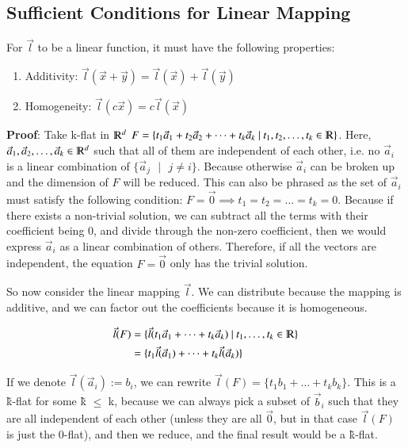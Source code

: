\documentclass [12 pt, twoside] {book}
\newcommand\+{\text{ }}
\begin{document}
\subsection{Sufficient Conditions for Linear Mapping}
For $\vec{l}$ to be a linear function, it must have the following properties:

\begin{enumerate}
    \item Additivity: $\vec{l}(\vec{x} + \vec{y}) = \vec{l}(\vec{x}) +
        \vec{l}(\vec{y})$
    \item Homogeneity: $\vec{l}(c\vec{x}) = c\vec{l}(\vec{x})$
\end{enumerate}
\vspace{0.2cm}

\textbf{Proof}: Take k-flat in $\varmathbb{R}^d$ $F = \{t_1\vec{a}_1 +
t_2\vec{a}_2 + \dots + t_k\vec{a}_k \+|\+ t_1, t_2, \dots, t_k \in
\varmathbb{R}\}$. Here, $\vec{a}_1, \vec{a}_2, \dots, \vec{a}_k \in
\varmathbb{R}^d$ such that all of them are independent of each other, i.e. no
$\vec{a}_i$ is a linear combination of $\{\vec{a}_j \+|\+ j \neq i\}$. Because
otherwise $\vec{a}_i$ can be broken up and the dimension of $F$ will be reduced.
This can also be phrased as the set of $\vec{a}_i$ must satisfy the following condition:
$F = \vec{0} \implies t_1 = t_2 = \dots = t_k = 0$. Because if there exists a
non-trivial solution, we can subtract all the terms with their coefficient being
0, and divide through the non-zero coefficient, then we would express
$\vec{a}_i$ as a linear combination of others. Therefore, if all the vectors are
independent, the equation $F = \vec{0}$ only has the trivial solution.

So now consider the linear mapping $\vec{l}$. We can distribute because the
mapping is additive, and we can factor out the coefficients because it is
homogeneous.

\begin{align*}
    \vec{l}(F) &= \{\vec{l}(t_1\vec{a}_1 + \dots + t_k\vec{a}_k) \+|\+ t_1, \dots, t_k \in \varmathbb{R}\}\\
               &= \{t_1 \vec{l}(\vec{a}_1) + \dots + t_k \vec{l}(\vec{a}_k)\}
\end{align*}

If we denote $\vec{l}(\vec{a}_i) := b_i$, we can rewrite $\vec{l}(F) = \{t_1
b_1 + \dots + t_k b_k\}$. This is a \~{k}-flat for some \~{k} $\leq$ k, because
we can always pick a subset of $\vec{b}_i$ such that they are all independent of
each other (unless they are all $\vec{0}$, but in that case $\vec{l}(F)$ is just
the 0-flat), and then we reduce, and the final result would be a \~{k}-flat.
\vspace{0.2cm}
\end{document}
